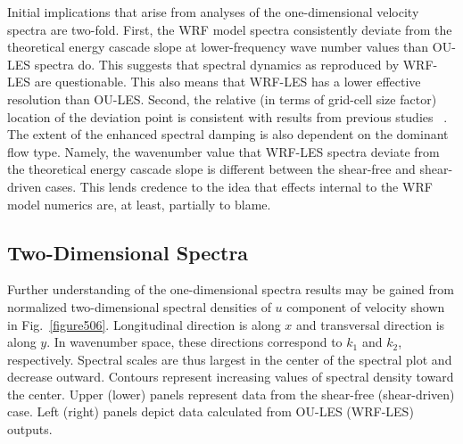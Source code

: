 Initial implications that arise from analyses of the one-dimensional velocity spectra are two-fold. First, the WRF model spectra consistently deviate from the theoretical energy cascade slope at lower-frequency wave number values than OU-LES spectra do. This suggests that spectral dynamics as reproduced by WRF-LES are questionable. This also means that WRF-LES has a lower effective resolution than OU-LES. Second, the relative (in terms of grid-cell size factor) location of the deviation point is consistent with results from previous studies ~\citep{Skamarock04}. The extent of the enhanced spectral damping is also dependent on the dominant flow type. Namely, the wavenumber value that WRF-LES spectra deviate from the theoretical energy cascade slope is different between the shear-free and shear-driven cases. This lends credence to the idea that effects internal to the WRF model numerics are, at least, partially to blame. 

\subsection{Two-Dimensional Spectra}
\label{spectra2d-533}

Further understanding of the one-dimensional spectra results may be gained from normalized two-dimensional spectral densities of $u$ component of velocity shown in Fig.~\ref{figure506}. Longitudinal direction is along $x$ and transversal direction is along $y$. In wavenumber space, these directions correspond to $k_1$ and $k_2$, respectively. Spectral scales are thus largest in the center of the spectral plot and decrease outward. Contours represent increasing values of spectral density toward the center. Upper (lower) panels represent data from the shear-free (shear-driven) case. Left (right) panels depict data calculated from OU-LES (WRF-LES) outputs.


